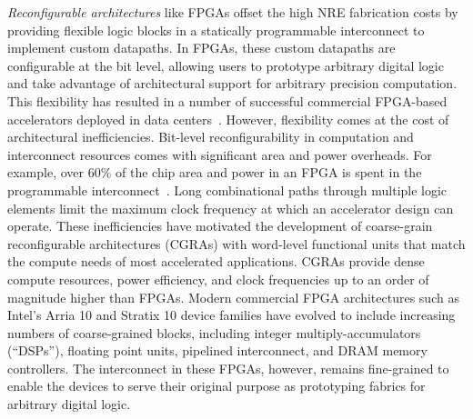 {\it Reconfigurable architectures} like FPGAs offset the high NRE
fabrication costs by providing flexible logic blocks in a statically
programmable interconnect to implement custom datapaths. 
In FPGAs, these custom datapaths are configurable at the bit level, allowing
users to prototype arbitrary digital logic and take advantage of architectural
support for arbitrary precision computation.
This flexibility has resulted in a number of successful commercial
FPGA-based accelerators deployed in data centers~\cite{catapult, catapultdnn, baidu}.   
However, flexibility comes at the cost of architectural inefficiencies.
Bit-level reconfigurability in computation and interconnect resources
comes with significant area and power overheads.
For example, over 60\% of the chip area and power in an FPGA is spent
in the programmable interconnect~\cite{fpgaSurvey, calhoun, bolsens, fpgaPower}. 
Long combinational paths through multiple logic elements
limit the maximum clock frequency at which an accelerator design can
operate. These inefficiencies have motivated the development of
coarse-grain reconfigurable architectures (CGRAs) with
word-level functional units that match the compute needs of most
accelerated applications. CGRAs provide dense compute resources,
power efficiency, and clock frequencies up to an order of magnitude
higher than FPGAs. Modern commercial FPGA architectures such as Intel's Arria 10 and Stratix 10 device families have evolved to include
increasing numbers of coarse-grained blocks, including integer
multiply-accumulators (``DSPs''), floating point units, pipelined interconnect, and DRAM memory controllers.
The interconnect in these FPGAs, however, remains fine-grained to enable the devices to serve their original
purpose as prototyping fabrics for arbitrary digital logic.


